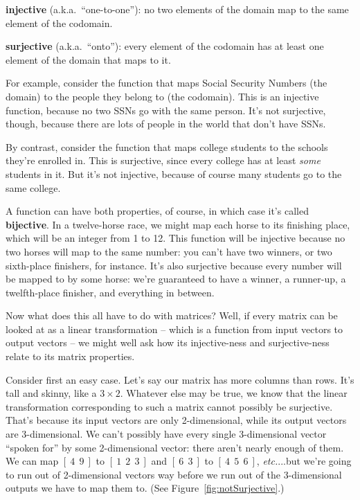 
\begin{compactenum}
\item \textbf{injective} (a.k.a.~``one-to-one''): no two elements of the domain
map to the same element of the codomain.
\item \textbf{surjective} (a.k.a.~``onto''): every element of the codomain has
at least one element of the domain that maps to it.
\end{compactenum}


For example, consider the function that maps Social Security Numbers (the
domain) to the people they belong to (the codomain). This is an injective
function, because no two SSNs go with the same person. It's not surjective,
though, because there are lots of people in the world that don't have SSNs.

By contrast, consider the function that maps college students to the schools
they're enrolled in. This is surjective, since every college has at least
\textit{some} students in it. But it's not injective, because of course many
students go to the same college.


A function can have both properties, of course, in which case it's called
\textbf{bijective}. In a twelve-horse race, we might map each horse to its
finishing place, which will be an integer from 1 to 12. This function will be
injective because no two horses will map to the same number: you can't have two
winners, or two sixth-place finishers, for instance. It's also surjective
because every number will be mapped to by some horse: we're guaranteed to have
a winner, a runner-up, a twelfth-place finisher, and everything in between.

\medskip

Now what does this all have to do with matrices? Well, if every matrix can be
looked at as a linear transformation -- which is a function from input vectors
to output vectors -- we might well ask how its injective-ness and
surjective-ness relate to its matrix properties.

Consider first an easy case. Let's say our matrix has more columns than rows.
It's tall and skinny, like a $3\times 2$. Whatever else may be true, we know
that the linear transformation corresponding to such a matrix cannot possibly
be surjective. That's because its input vectors are only 2-dimensional, while
its output vectors are 3-dimensional. We can't possibly have every single
3-dimensional vector ``spoken for'' by some 2-dimensional vector: there aren't
nearly enough of them. We can map $[\ 4\ \ 9\ ]$ to $[\ 1\ \ 2\ \ 3\ ]$ and $[\
6\ \ 3\ ]$ to $[\ 4\ \ 5\ \ 6\ ]$, \textit{etc.}...but we're going to run out
of 2-dimensional vectors way before we run out of the 3-dimensional outputs we
have to map them to. (See Figure~\ref{fig:notSurjective}.)

